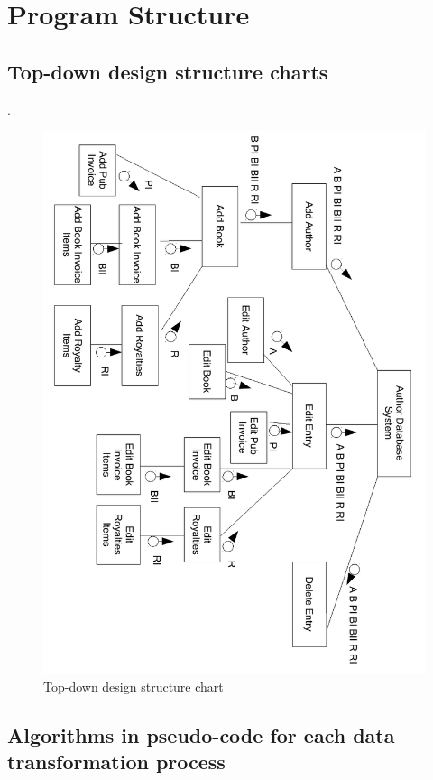 \section{Program Structure}

\subsection{Top-down design structure charts}
.
\begin{figure}[H]
    \caption{Top-down design structure chart} \label{Top_down_design_structure_chart.pdf}
    \includegraphics[width=\textwidth]{./Design/Top-down_design_structure_chart.pdf}
\end{figure}

\subsection{Algorithms in pseudo-code for each data transformation process}

